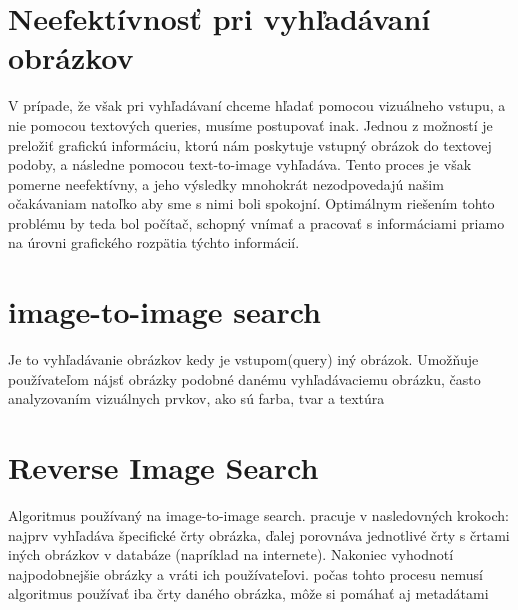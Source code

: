 \documentclass[10pt,twoside,slovak,a4paper]{article}
\begin{document}
\newpage




\section{Neefektívnosť pri vyhľadávaní obrázkov} \label{04}
V prípade, že však pri vyhľadávaní chceme hľadať pomocou vizuálneho vstupu, a nie pomocou textových queries, musíme postupovať inak. Jednou z možností je preložiť grafickú informáciu, ktorú nám poskytuje vstupný obrázok do textovej podoby, a následne pomocou text-to-image vyhľadáva. Tento proces je však pomerne neefektívny, a jeho výsledky mnohokrát nezodpovedajú našim očakávaniam natoľko aby sme s nimi boli spokojní.
Optimálnym riešením tohto problému by teda bol počítač, schopný vnímať a pracovať s informáciami priamo na úrovni grafického rozpätia týchto informácií.

\newpage


\section{image-to-image search} \label{05}
Je to vyhľadávanie obrázkov kedy je vstupom(query) iný obrázok. Umožňuje používateľom nájsť obrázky podobné danému vyhľadávaciemu obrázku, často analyzovaním vizuálnych prvkov, ako sú farba, tvar a textúra

\section{Reverse Image Search} \label{08}
Algoritmus používaný na image-to-image search. pracuje v nasledovných krokoch: najprv vyhľadáva špecifické črty obrázka, ďalej porovnáva jednotlivé črty s črtami iných obrázkov v databáze (napríklad na internete). Nakoniec vyhodnotí najpodobnejšie obrázky a vráti ich používateľovi. počas tohto procesu nemusí algoritmus používať iba črty daného obrázka, môže si pomáhať aj metadátami
\end{document}
